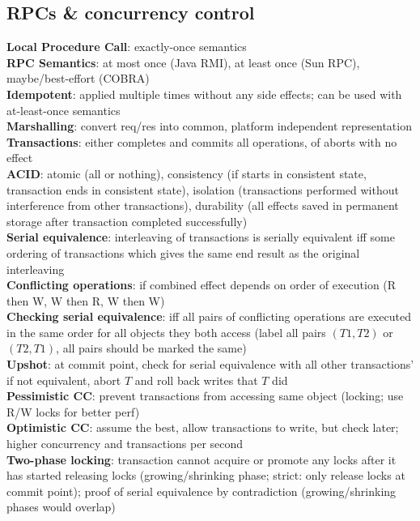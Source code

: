 \documentclass{article}
\begin{document}
\begin{multicols*}{3}
\section{RPCs \& concurrency control}
\textbf{Local Procedure Call}: exactly-once semantics \\
\textbf{RPC Semantics}: at most once (Java RMI), at least once (Sun RPC), maybe/best-effort (COBRA) \\
\textbf{Idempotent}: applied multiple times without any side effects; can be used with at-least-once semantics \\
\textbf{Marshalling}: convert req/res into common, platform independent representation \\
\textbf{Transactions}: either completes and commits all operations, of aborts with no effect \\
\textbf{ACID}: atomic (all or nothing), consistency (if starts in consistent state, transaction ends in consistent state), isolation (transactions performed without interference from other transactions), durability (all effects saved in permanent storage after transaction completed successfully) \\
\textbf{Serial equivalence}: interleaving of transactions is serially equivalent iff some ordering of transactions which gives the same end result as the original interleaving \\
\textbf{Conflicting operations}: if combined effect depends on order of execution (R then W, W then R, W then W) \\
\textbf{Checking serial equivalence}: iff all pairs of conflicting operations are executed in the same order for all objects they both access (label all pairs $(T1, T2)$ or $(T2, T1)$, all pairs should be marked the same) \\
\textbf{Upshot}: at commit point, check for serial equivalence with all other transactions' if not equivalent, abort $T$ and roll back writes that $T$ did \\
\textbf{Pessimistic CC}: prevent transactions from accessing same object (locking; use R/W locks for better perf) \\
\textbf{Optimistic CC}: assume the best, allow transactions to write, but check later; higher concurrency and transactions per second \\
\textbf{Two-phase locking}: transaction cannot acquire or promote any locks after it has started releasing locks (growing/shrinking phase; strict: only release locks at commit point); proof of serial equivalence by contradiction (growing/shrinking phases would overlap) \\

\end{multicols*}
\end{document}
